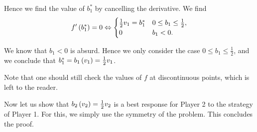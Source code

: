 Hence we find the value of $b_1^{*}$ by cancelling the derivative. We find
\begin{equation*}
    f' \left(b_1^{*}\right) = 0
    \Leftrightarrow
    \begin{cases}
       \frac{1}{2} v_1 = b_1^{*}  & 0 \leq b_1 \leq \frac{1}{2}, \\
       0 & b_1 < 0.
     \end{cases}
\end{equation*}

We know that $b_1 < 0$ is absurd. Hence we only consider the case $0 \leq b_1 \leq \frac{1}{2}$, and we conclude that $b_1^{*} = b_1 \left(v_1\right) = \frac{1}{2} v_1$.

Note that one should still check the values of $f$ at discontinuous points, which is left to the reader.


\vspace{5mm}

Now let us show that $b_2 \left(v_2\right) = \frac{1}{2} v_2$ is a best response for Player 2 to the strategy of Player 1. For this, we simply use the symmetry of the problem. This concludes the proof.
